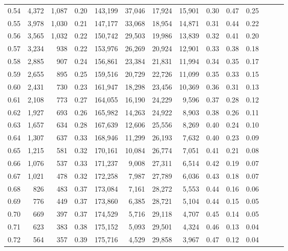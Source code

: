 \begin{tabular}{rrrrrrrrrrrrrr}
0.54 &  4,372 &  1,087 &  0.20 &  143,199 &   37,046 &  17,924 &  15,901 &  0.30 &  0.47 &      0.25 \\
0.55 &  3,978 &  1,030 &  0.21 &  147,177 &   33,068 &  18,954 &  14,871 &  0.31 &  0.44 &      0.22 \\
0.56 &  3,565 &  1,032 &  0.22 &  150,742 &   29,503 &  19,986 &  13,839 &  0.32 &  0.41 &      0.20 \\
0.57 &  3,234 &    938 &  0.22 &  153,976 &   26,269 &  20,924 &  12,901 &  0.33 &  0.38 &      0.18 \\
0.58 &  2,885 &    907 &  0.24 &  156,861 &   23,384 &  21,831 &  11,994 &  0.34 &  0.35 &      0.17 \\
0.59 &  2,655 &    895 &  0.25 &  159,516 &   20,729 &  22,726 &  11,099 &  0.35 &  0.33 &      0.15 \\
0.60 &  2,431 &    730 &  0.23 &  161,947 &   18,298 &  23,456 &  10,369 &  0.36 &  0.31 &      0.13 \\
0.61 &  2,108 &    773 &  0.27 &  164,055 &   16,190 &  24,229 &   9,596 &  0.37 &  0.28 &      0.12 \\
0.62 &  1,927 &    693 &  0.26 &  165,982 &   14,263 &  24,922 &   8,903 &  0.38 &  0.26 &      0.11 \\
0.63 &  1,657 &    634 &  0.28 &  167,639 &   12,606 &  25,556 &   8,269 &  0.40 &  0.24 &      0.10 \\
0.64 &  1,307 &    637 &  0.33 &  168,946 &   11,299 &  26,193 &   7,632 &  0.40 &  0.23 &      0.09 \\
0.65 &  1,215 &    581 &  0.32 &  170,161 &   10,084 &  26,774 &   7,051 &  0.41 &  0.21 &      0.08 \\
0.66 &  1,076 &    537 &  0.33 &  171,237 &    9,008 &  27,311 &   6,514 &  0.42 &  0.19 &      0.07 \\
0.67 &  1,021 &    478 &  0.32 &  172,258 &    7,987 &  27,789 &   6,036 &  0.43 &  0.18 &      0.07 \\
0.68 &    826 &    483 &  0.37 &  173,084 &    7,161 &  28,272 &   5,553 &  0.44 &  0.16 &      0.06 \\
0.69 &    776 &    449 &  0.37 &  173,860 &    6,385 &  28,721 &   5,104 &  0.44 &  0.15 &      0.05 \\
0.70 &    669 &    397 &  0.37 &  174,529 &    5,716 &  29,118 &   4,707 &  0.45 &  0.14 &      0.05 \\
0.71 &    623 &    383 &  0.38 &  175,152 &    5,093 &  29,501 &   4,324 &  0.46 &  0.13 &      0.04 \\
0.72 &    564 &    357 &  0.39 &  175,716 &    4,529 &  29,858 &   3,967 &  0.47 &  0.12 &      0.04 \\

\end{tabular}
